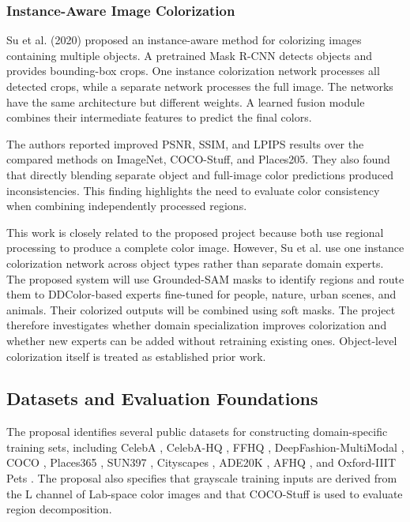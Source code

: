 \documentclass{FastFyp}
\begin{document}
\subsubsection{Instance-Aware Image Colorization}

Su et al. (2020) proposed an instance-aware method for colorizing images containing multiple objects\cite{su2020instance}. A pretrained Mask R-CNN detects objects and provides bounding-box crops. One instance colorization network processes all detected crops, while a separate network processes the full image. The networks have the same architecture but different weights. A learned fusion module combines their intermediate features to predict the final colors.

The authors reported improved PSNR, SSIM, and LPIPS results over the compared methods on ImageNet, COCO-Stuff, and Places205. They also found that directly blending separate object and full-image color predictions produced inconsistencies. This finding highlights the need to evaluate color consistency when combining independently processed regions.

This work is closely related to the proposed project because both use regional processing to produce a complete color image. However, Su et al. use one instance colorization network across object types rather than separate domain experts. The proposed system will use Grounded-SAM masks to identify regions and route them to DDColor-based experts fine-tuned for people, nature, urban scenes, and animals. Their colorized outputs will be combined using soft masks. The project therefore investigates whether domain specialization improves colorization and whether new experts can be added without retraining existing ones. Object-level colorization itself is treated as established prior work.

\subsection{Datasets and Evaluation Foundations}

The proposal identifies several public datasets for constructing domain-specific training sets, including CelebA \cite{celeba2015}, CelebA-HQ \cite{pggan2018}, FFHQ \cite{ffhq2019}, DeepFashion-MultiModal \cite{text2human2022}, COCO \cite{ref19}, Places365 \cite{places365}, SUN397 \cite{sun397}, Cityscapes \cite{ref20}, ADE20K \cite{ref18}, AFHQ \cite{afhq2020}, and Oxford-IIIT Pets \cite{pets2012}. The proposal also specifies that grayscale training inputs are derived from the L channel of Lab-space color images and that COCO-Stuff \cite{caesar2018cocostuff} is used to evaluate region decomposition.
\end{document}
